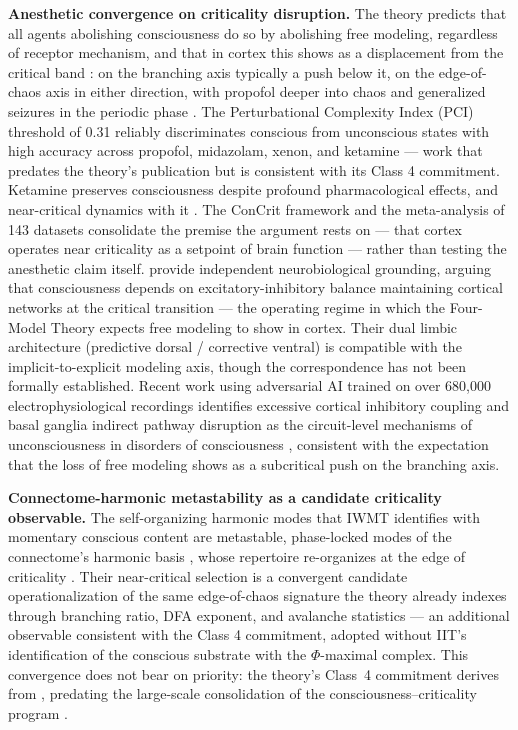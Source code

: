 \documentclass[12pt]{article}
\begin{document}
\textbf{Anesthetic convergence on criticality disruption.} The theory predicts that all agents abolishing consciousness do so by abolishing free modeling, regardless of receptor mechanism, and that in cortex this shows as a displacement from the critical band \citep{Gruber2015}: on the branching axis typically a push below it, on the edge-of-chaos axis in either direction, with propofol deeper into chaos and generalized seizures in the periodic phase \citep{Toker2022}. The Perturbational Complexity Index (PCI) threshold of 0.31 reliably discriminates conscious from unconscious states with high accuracy across propofol, midazolam, xenon, and ketamine \citep{Casali2013,Casarotto2016} --- work that predates the theory's publication but is consistent with its Class 4 commitment. Ketamine preserves consciousness despite profound pharmacological effects, and near-critical dynamics with it \citep{Maschke2024}. The ConCrit framework \citep{AlgomShriki2026} and the \citet{HengenShew2025} meta-analysis of 143 datasets consolidate the premise the argument rests on --- that cortex operates near criticality as a setpoint of brain function --- rather than testing the anesthetic claim itself. \citet{TuckerLuuFriston2025} provide independent neurobiological grounding, arguing that consciousness depends on excitatory-inhibitory balance maintaining cortical networks at the critical transition --- the operating regime in which the Four-Model Theory expects free modeling to show in cortex. Their dual limbic architecture (predictive dorsal / corrective ventral) is compatible with the implicit-to-explicit modeling axis, though the correspondence has not been formally established. Recent work using adversarial AI trained on over 680,000 electrophysiological recordings identifies excessive cortical inhibitory coupling and basal ganglia indirect pathway disruption as the circuit-level mechanisms of unconsciousness in disorders of consciousness \citep{Toker2026}, consistent with the expectation that the loss of free modeling shows as a subcritical push on the branching axis.

\textbf{Connectome-harmonic metastability as a candidate criticality observable.} The self-organizing harmonic modes that IWMT \citep{Safron2020} identifies with momentary conscious content are metastable, phase-locked modes of the connectome's harmonic basis \citep{Atasoy2016}, whose repertoire re-organizes at the edge of criticality \citep{Atasoy2017}. Their near-critical selection is a convergent candidate operationalization of the same edge-of-chaos signature the theory already indexes through branching ratio, DFA exponent, and avalanche statistics --- an additional observable consistent with the Class 4 commitment, adopted without IIT's identification of the conscious substrate with the $\Phi$-maximal complex. This convergence does not bear on priority: the theory's Class~4 commitment derives from \citet{Gruber2015}, predating the large-scale consolidation of the consciousness--criticality program \citep{HengenShew2025,AlgomShriki2026}.
\end{document}
